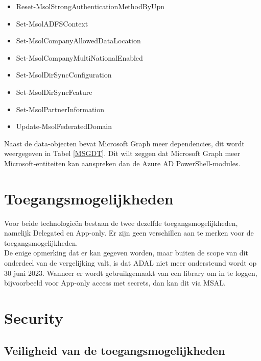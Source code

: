 \begin{itemize}
\begin{itemize}
        \item Reset-MsolStrongAuthenticationMethodByUpn
        \item Set-MsolADFSContext
        \item Set-MsolCompanyAllowedDataLocation
        \item Set-MsolCompanyMultiNationalEnabled
        \item Set-MsolDirSyncConfiguration
        \item Set-MsolDirSyncFeature
        \item Set-MsolPartnerInformation
        \item Update-MsolFederatedDomain    
    \end{itemize}
\end{itemize}

Naast de data-objecten bevat Microsoft Graph meer dependencies, dit wordt weergegeven in Tabel \ref{MSGDT}. Dit wilt zeggen dat Microsoft Graph meer Microsoft-entiteiten kan aanspreken dan de Azure \ac{AD} PowerShell-modules. 


\section{Toegangsmogelijkheden}




Voor beide technologieën bestaan de twee dezelfde toegangsmogelijkheden, namelijk Delegated en App-only. Er zijn geen verschillen aan te merken voor de toegangsmogelijkheden. \\

De enige opmerking dat er kan gegeven worden, maar buiten de scope van dit onderdeel van de vergelijking valt, is dat \ac{ADAL} niet meer ondersteund wordt op 30 juni 2023. Wanneer er wordt gebruikgemaakt van een library om in te loggen, bijvoorbeeld voor App-only access met secrets, dan kan dit via \ac{MSAL}.



\section{Security}

\subsection{Veiligheid van de toegangsmogelijkheden}

